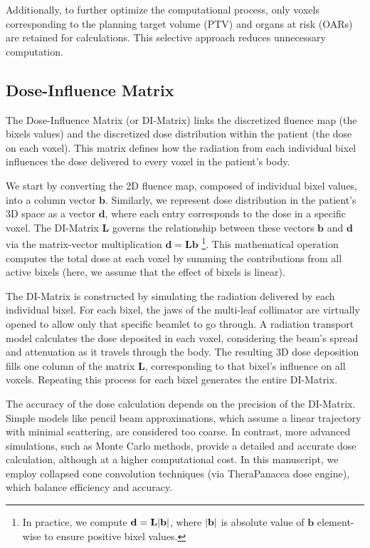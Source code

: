 Additionally, to further optimize the computational process, only voxels corresponding to the planning target volume (PTV) and organs at risk (OARs) are retained for calculations.
This selective approach reduces unnecessary computation.

\subsection[DI-Matrix]{Dose-Influence Matrix}
The Dose-Influence Matrix (or DI-Matrix) links the discretized fluence map (the bixels values) and the discretized dose distribution within the patient (the dose on each voxel).
This matrix defines how the radiation from each individual bixel influences the dose delivered to every voxel in the patient's body.

We start by converting the 2D fluence map, composed of individual bixel values, into a column vector $\textbf{b}$.
Similarly, we represent dose distribution in the patient's 3D space as a vector $\mathbf{d}$, where each entry corresponds to the dose in a specific voxel.
The DI-Matrix $\textbf{L}$ governs the relationship between these vectors $\mathbf{b}$ and $\mathbf{d}$ via the matrix-vector multiplication $\mathbf{d} = \textbf{L}\mathbf{b}$ \footnote{In practice, we compute $\textbf{d} = \textbf{L}|{\textbf{b}}|$, where $|{\textbf{b}}|$ is absolute value of $\textbf{b}$ element-wise to ensure positive bixel values.}.
This mathematical operation computes the total dose at each voxel by summing the contributions from all active bixels (here, we assume that the effect of bixels is linear).

The DI-Matrix is constructed by simulating the radiation delivered by each individual bixel.
For each bixel, the jaws of the multi-leaf collimator are virtually opened to allow only that specific beamlet to go through.
A radiation transport model calculates the dose deposited in each voxel, considering the beam's spread and attenuation as it travels through the body.
The resulting 3D dose deposition fills one column of the matrix $\textbf{L}$, corresponding to that bixel's influence on all voxels.
Repeating this process for each bixel generates the entire DI-Matrix.

The accuracy of the dose calculation depends on the precision of the DI-Matrix.
Simple models like pencil beam approximations, which assume a linear trajectory with minimal scattering, are considered too coarse.
In contrast, more advanced simulations, such as Monte Carlo methods, provide a detailed and accurate dose calculation, although at a higher computational cost.
In this manuscript, we employ collapsed cone convolution techniques (via TheraPanacea dose engine), which balance efficiency and accuracy.

